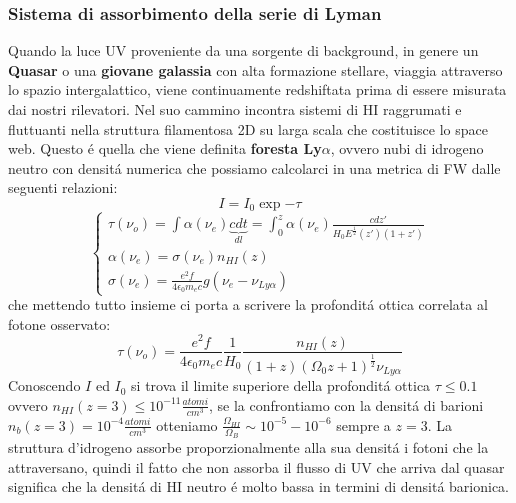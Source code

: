 \documentclass[12pt, a4paper]{article}
\begin{document}
\subsubsection{Sistema di assorbimento della serie di Lyman}
Quando la luce UV proveniente da una sorgente di background, in genere un \textbf{Quasar} o una \textbf{giovane galassia} con alta formazione stellare, viaggia attraverso lo spazio intergalattico, viene continuamente redshiftata prima di essere misurata dai nostri rilevatori. Nel suo cammino incontra sistemi di HI raggrumati e fluttuanti nella struttura filamentosa 2D su larga scala che costituisce lo space web. Questo \'{e} quella che viene definita \textbf{foresta Ly$\alpha$}, ovvero nubi di idrogeno neutro con densit\'{a} numerica che possiamo calcolarci in una metrica di FW dalle seguenti relazioni:
\begin{equation}
I=I_0 \exp{-\tau}
\end{equation}
\begin{equation}
\begin{cases}
\tau(\nu_o)=\int \alpha(\nu_e) \underbrace{cdt}_{dl}=\int_0^z \alpha(\nu_e) \frac{c dz'}{H_0 E^{\frac{1}{2}}(z') (1+z')}
\\
\alpha(\nu_e)=\sigma(\nu_e) n_{HI}(z)
\\
\sigma(\nu_e)=\frac{e^2f}{4\epsilon_0 m_e c}g(\nu_e-\nu_{Ly\alpha})
\end{cases}
\end{equation}
che mettendo tutto insieme ci porta a scrivere la profondit\'{a} ottica correlata al fotone osservato:
\begin{equation}
\tau(\nu_o)=\frac{e^2f}{4\epsilon_0 m_e c} \frac{1}{H_0} \frac{n_{HI}(z)}{(1+z)(\Omega_0 z+1)^{\frac{1}{2}}\nu_{Ly\alpha}}
\end{equation}
Conoscendo $I$ ed $I_0$ si trova il limite superiore della profondit\'{a} ottica $\tau \leq 0.1$ ovvero $n_{HI}(z=3)\leq 10^{-11}\frac{atomi}{cm^3}$, se la confrontiamo con la densit\'{a} di barioni $n_{b}(z=3)= 10^{-4}\frac{atomi}{cm^3}$ otteniamo $\frac{\Omega_{HI}}{\Omega_B}\sim 10^{-5}-10^{-6}$ sempre a $z=3$. La struttura d'idrogeno assorbe proporzionalmente alla sua densit\'{a} i fotoni che la attraversano, quindi il fatto che non assorba il flusso di UV che arriva dal quasar significa che la densit\'{a} di HI neutro \'{e} molto bassa in termini di densit\'{a} barionica.\\
\end{document}
